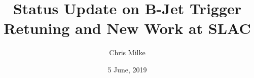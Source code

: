 \documentclass{beamer}
\begin{document}
\title{Status Update on B-Jet Trigger Retuning and New Work at SLAC}   
\author{Chris Milke} 
\date{5 June, 2019} 

\frame{\titlepage} 





\end{document}
